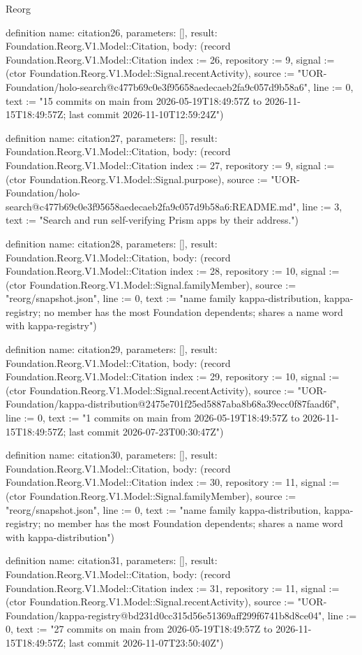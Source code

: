 \begin{lexlean}{Reorg}
\begin{semanticmodule}
definition{
  name: citation26,
  parameters: [],
  result: Foundation.Reorg.V1.Model::Citation,
  body: (record Foundation.Reorg.V1.Model::Citation {index := 26, repository := 9, signal := (ctor Foundation.Reorg.V1.Model::Signal.recentActivity), source := "UOR-Foundation/holo-search@c477b69c0e3f95658aedecaeb2fa9c057d9b58a6", line := 0, text := "15 commits on main from 2026-05-19T18:49:57Z to 2026-11-15T18:49:57Z; last commit 2026-11-10T12:59:24Z"})
}

definition{
  name: citation27,
  parameters: [],
  result: Foundation.Reorg.V1.Model::Citation,
  body: (record Foundation.Reorg.V1.Model::Citation {index := 27, repository := 9, signal := (ctor Foundation.Reorg.V1.Model::Signal.purpose), source := "UOR-Foundation/holo-search@c477b69c0e3f95658aedecaeb2fa9c057d9b58a6:README.md", line := 3, text := "Search and run self-verifying Prism apps by their address."})
}

definition{
  name: citation28,
  parameters: [],
  result: Foundation.Reorg.V1.Model::Citation,
  body: (record Foundation.Reorg.V1.Model::Citation {index := 28, repository := 10, signal := (ctor Foundation.Reorg.V1.Model::Signal.familyMember), source := "reorg/snapshot.json", line := 0, text := "name family {kappa-distribution, kappa-registry}; no member has the most Foundation dependents; shares a name word with kappa-registry"})
}

definition{
  name: citation29,
  parameters: [],
  result: Foundation.Reorg.V1.Model::Citation,
  body: (record Foundation.Reorg.V1.Model::Citation {index := 29, repository := 10, signal := (ctor Foundation.Reorg.V1.Model::Signal.recentActivity), source := "UOR-Foundation/kappa-distribution@2475e701f25ed5887aba8b68a39ecc0f87faad6f", line := 0, text := "1 commits on main from 2026-05-19T18:49:57Z to 2026-11-15T18:49:57Z; last commit 2026-07-23T00:30:47Z"})
}

definition{
  name: citation30,
  parameters: [],
  result: Foundation.Reorg.V1.Model::Citation,
  body: (record Foundation.Reorg.V1.Model::Citation {index := 30, repository := 11, signal := (ctor Foundation.Reorg.V1.Model::Signal.familyMember), source := "reorg/snapshot.json", line := 0, text := "name family {kappa-distribution, kappa-registry}; no member has the most Foundation dependents; shares a name word with kappa-distribution"})
}

definition{
  name: citation31,
  parameters: [],
  result: Foundation.Reorg.V1.Model::Citation,
  body: (record Foundation.Reorg.V1.Model::Citation {index := 31, repository := 11, signal := (ctor Foundation.Reorg.V1.Model::Signal.recentActivity), source := "UOR-Foundation/kappa-registry@bd231d0cc315d56e51369aff299f6741b8d8ce04", line := 0, text := "27 commits on main from 2026-05-19T18:49:57Z to 2026-11-15T18:49:57Z; last commit 2026-11-07T23:50:40Z"})
}


\end{semanticmodule}
\end{lexlean}
